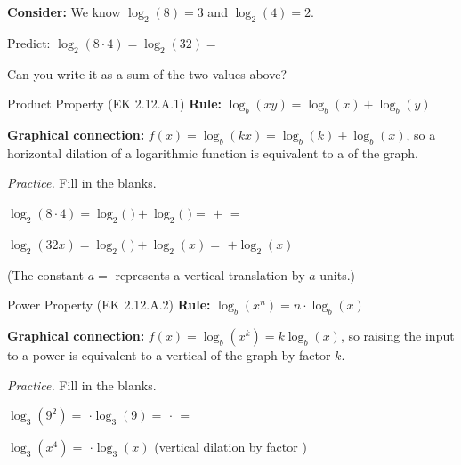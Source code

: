 \documentclass[10pt]{article}
\begin{document}
\vspace{0.08in}

\begin{hookbox}
\textbf{Consider:} We know $\log_2(8) = 3$ and $\log_2(4) = 2$.

\vspace{4pt}
Predict: $\log_2(8 \cdot 4) = \log_2(32) = $ 

\vspace{2pt}
Can you write it as a sum of the two values above? 
\end{hookbox}

\vspace{0.08in}

\begin{notesbox}{Product Property (EK 2.12.A.1)}
\textbf{Rule:} $\log_b(xy) = \log_b(x) + \log_b(y)$

\vspace{6pt}
\textbf{Graphical connection:} $f(x) = \log_b(kx) = \log_b(k) + \log_b(x)$, so a horizontal
dilation of a logarithmic function is equivalent to a  of the graph.

\vspace{8pt}
\textit{Practice.} Fill in the blanks.

\vspace{4pt}
$\log_2(8 \cdot 4) = \log_2($  $) + \log_2($  $) = $  $+$  $=$ 

\vspace{6pt}
$\log_2(32x) = \log_2($  $) + \log_2(x) = $  $+ \log_2(x)$

\vspace{4pt}
(The constant $a = $  represents a vertical translation  by $a$ units.)
\end{notesbox}

\vspace{0.08in}

\begin{notesbox}{Power Property (EK 2.12.A.2)}
\textbf{Rule:} $\log_b(x^n) = n \cdot \log_b(x)$

\vspace{6pt}
\textbf{Graphical connection:} $f(x) = \log_b(x^k) = k\log_b(x)$, so raising the input to a
power is equivalent to a vertical  of the graph by factor $k$.

\vspace{8pt}
\textit{Practice.} Fill in the blanks.

\vspace{4pt}
$\log_3(9^2) = $  $\cdot \log_3(9) = $  $\cdot$  $=$ 

\vspace{6pt}
$\log_3(x^4) = $  $\cdot \log_3(x)$ \qquad (vertical dilation by factor )
\end{notesbox}
\end{document}
